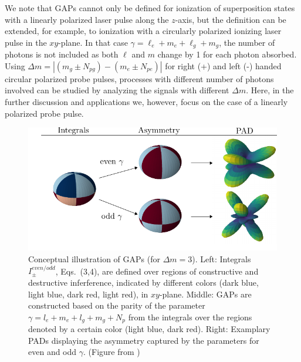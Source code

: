 We note that GAPs cannot only be defined for ionization of superposition states with a linearly polarized laser pulse along the $z$-axis, but the definition can be extended, for example, to ionization with a circularly polarized ionizing laser pulse in the $xy$-plane. In that case $\gamma=\ell_e + m_e + \ell_g + m_g$, the number of photons is not included as both $\ell$ and $m$ change by 1 for each photon absorbed. Using $\Delta m = |(m_g \pm N_{pg}) - (m_e \pm N_{pe})|$  for right (+) and left (-) handed circular polarized probe pulses, processes with different number of photons involved can be studied by analyzing the signals with different $\Delta m$. Here, in the further discussion and applications we, however, focus on the case of a linearly polarized probe pulse.

\begin{figure}[!ht]
\centering
\includegraphics[width=\linewidth]{figs/Photo_ionization/GAP/integral_combined.pdf}
\caption{
Conceptual illustration of GAPs (for $\Delta m=3$). Left: Integrals $I_\pm^{even/odd}$, Eqs.~(3,4), are defined over regions of constructive and destructive inferference, indicated by different colors (dark blue, light blue, dark red, light red), in $xy$-plane.
Middle: GAPs are constructed based on the parity of the parameter $\gamma = l_e+m_e+l_g+m_g+N_p$ from the integrals over the regions denoted by a certain color (light blue, dark red). 
Right: Examplary PADs displaying the asymmetry captured by the parameters for even and odd $\gamma$. (Figure from \cite{venzke2020_GAP})
} 
  \label{fig:integrals}
\end{figure}

